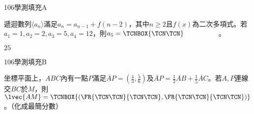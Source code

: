 \begin{QUESTIONS}
    \begin{QUESTION}
        \begin{ExamInfo}{106}{學測}{填充}{A}
        \end{ExamInfo}
        \begin{ExamAnsRateInfo}{54}{82}{60}{20}
        \end{ExamAnsRateInfo}
        \begin{QBODY}
            遞迴數列$\langle {{a}_{n}}\rangle $滿足${{a}_{n}}={{a}_{n-1}}+f(n-2)$，其中$n\ge 2$且$f(x)$為二次多項式。若${{a}_{1}}=1,{{a}_{2}}=2,{{a}_{3}}=5,{{a}_{4}}=12$，則${{a}_{5}}= \TCNBOX{ \TCN\TCN }$　　　　　。
        \end{QBODY}
        \begin{QFROMS}
        \end{QFROMS}
        \begin{QTAGS}\end{QTAGS}
        \begin{QANS}
            $25$
        \end{QANS}
        \begin{QSOLLIST}
        \end{QSOLLIST}
        \begin{QEMPTYSPACE}
        \end{QEMPTYSPACE}
    \end{QUESTION}
    \begin{QUESTION}
        \begin{ExamInfo}{106}{學測}{填充}{B}
        \end{ExamInfo}
        \begin{ExamAnsRateInfo}{26}{65}{12}{1}
        \end{ExamAnsRateInfo}
        \begin{QBODY}
            坐標平面上，$ABC$內有一點$P$滿足$\lvec{AP}=(\frac{4}{3},\frac{5}{6})$及$\lvec{AP}=\frac{1}{2}\lvec{AB}+\frac{1}{5}\lvec{AC}$。若$A,P$連線交$\overline{BC}$於$M$，則$\lvec{AM}= \TCNBOX{\left(\FR{\TCN\TCN}{\TCN\TCN} ,\FR{\TCN\TCN}{\TCN\TCN} \right)}$。（化成最簡分數）
        \end{QBODY}
        \begin{QFROMS}
        \end{QFROMS}
        \begin{QTAGS}\end{QTAGS}
        \begin{QANS}

\end{QANS}
\end{QUESTION}
\end{QUESTIONS}

